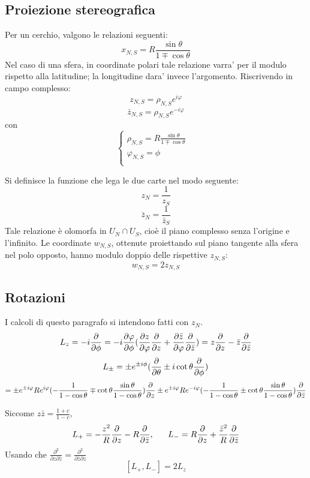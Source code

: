 \subsection{Proiezione stereografica}
Per un cerchio, valgono le relazioni seguenti:
\[ x_{N,S} = R \frac{\sin\theta}{1\mp\cos\theta} \]
Nel caso di una sfera, in coordinate polari tale relazione varra' per il modulo rispetto alla latitudine; la longitudine dara' invece l'argomento. Riscrivendo in campo complesso:
\[ z_{N,S} = \rho_{N,S} e^{i\varphi} \]
\[ \bar{z}_{N,S} = \rho_{N,S} e^{-i\varphi} \]
con 
\[ \begin{cases}
	\rho_{N,S} = R \frac{\sin\theta}{1\mp\cos\theta} & \\
	\varphi_{N,S} = \phi & \\
   \end{cases}
\]


Si definisce la funzione che lega le due carte nel modo seguente:
\[ z_N = \frac{1}{z_S} \]
\[ \bar{z}_N = \frac{1}{\bar{z}_S} \]
Tale relazione \`e olomorfa in \( U_N \cap U_S \), cio\`e il piano complesso senza l'origine e l'infinito.
Le coordinate $w_{N,S}$, ottenute proiettando sul piano tangente alla sfera nel polo opposto, hanno modulo doppio delle rispettive $z_{N,S}$:
\[ w_{N,S} = 2z_{N,S} \]

\subsection{Rotazioni}
I calcoli di questo paragrafo si intendono fatti con $z_N$. %
\[ L_z = -i\frac{\partial }{\partial \phi} = -i \frac{\partial \varphi}{\partial \phi}(\frac{\partial z}{\partial \varphi}\frac{\partial }{\partial z} + \frac{\partial \bar{z}}{\partial \varphi}\frac{\partial }{\partial \bar{z}}) = z\frac{\partial }{\partial z} - \bar{z}\frac{\partial }{\partial \bar{z}}\]
\[ L_\pm = \pm e^{\pm i\phi} (\frac{\partial }{\partial \theta} \pm i \cot\theta \frac{\partial }{\partial \phi} ) \]
\[ = \pm e^{\pm i\varphi}Re^{i\varphi}  (-\frac{1}{1- \cos\theta} \mp  \cot\theta \frac{\sin\theta}{1-\cos\theta})\frac{\partial }{\partial z} \pm e^{\pm i\varphi}Re^{-i\varphi}  (-\frac{1}{1- \cos\theta} \pm  \cot\theta \frac{\sin\theta}{1-\cos\theta})\frac{\partial }{\partial \bar{z}} \]

Siccome \( z\bar{z} = \frac{1+c}{1-c}\),
\[ L_+ = -\frac{z^2}{R}\frac{\partial }{\partial z} -R\frac{\partial }{\partial \bar{z}} , \;\;\;\;\;\;  L_- = R\frac{\partial }{\partial z} + \frac{\bar{z}^2}{R}\frac{\partial }{\partial \bar{z}} \]
Usando che \( \frac{\partial^2}{\partial z \partial \bar{z}} = \frac{\partial^2}{\partial \bar{z} \partial z}\) 
\[ [L_+,L_-] = 2L_z \]



